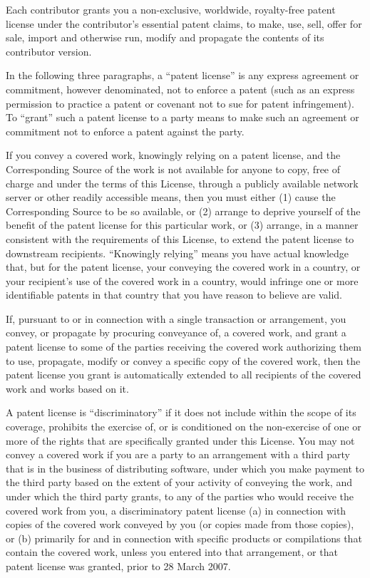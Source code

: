 \documentclass[10pt,english]{article}
\begin{document}
Each contributor grants you a non-exclusive, worldwide, royalty-free
patent license under the contributor's essential patent claims, to
make, use, sell, offer for sale, import and otherwise run, modify
and propagate the contents of its contributor version.

In the following three paragraphs, a \textquotedblleft{}patent license\textquotedblright{}
is any express agreement or commitment, however denominated, not to
enforce a patent (such as an express permission to practice a patent
or covenant not to sue for patent infringement). To \textquotedblleft{}grant\textquotedblright{}
such a patent license to a party means to make such an agreement or
commitment not to enforce a patent against the party.

If you convey a covered work, knowingly relying on a patent license,
and the Corresponding Source of the work is not available for anyone
to copy, free of charge and under the terms of this License, through
a publicly available network server or other readily accessible means,
then you must either (1) cause the Corresponding Source to be so available,
or (2) arrange to deprive yourself of the benefit of the patent license
for this particular work, or (3) arrange, in a manner consistent with
the requirements of this License, to extend the patent license to
downstream recipients. \textquotedblleft{}Knowingly relying\textquotedblright{}
means you have actual knowledge that, but for the patent license,
your conveying the covered work in a country, or your recipient's
use of the covered work in a country, would infringe one or more identifiable
patents in that country that you have reason to believe are valid.

If, pursuant to or in connection with a single transaction or arrangement,
you convey, or propagate by procuring conveyance of, a covered work,
and grant a patent license to some of the parties receiving the covered
work authorizing them to use, propagate, modify or convey a specific
copy of the covered work, then the patent license you grant is automatically
extended to all recipients of the covered work and works based on
it.

A patent license is \textquotedblleft{}discriminatory\textquotedblright{}
if it does not include within the scope of its coverage, prohibits
the exercise of, or is conditioned on the non-exercise of one or more
of the rights that are specifically granted under this License. You
may not convey a covered work if you are a party to an arrangement
with a third party that is in the business of distributing software,
under which you make payment to the third party based on the extent
of your activity of conveying the work, and under which the third
party grants, to any of the parties who would receive the covered
work from you, a discriminatory patent license (a) in connection with
copies of the covered work conveyed by you (or copies made from those
copies), or (b) primarily for and in connection with specific products
or compilations that contain the covered work, unless you entered
into that arrangement, or that patent license was granted, prior to
28 March 2007.
\end{document}
